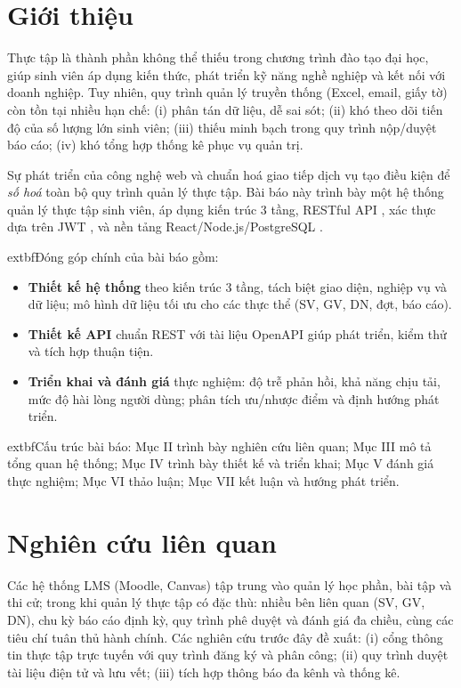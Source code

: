 \documentclass[conference]{IEEEtran}
\begin{document}
\section{Giới thiệu}
Thực tập là thành phần không thể thiếu trong chương trình đào tạo đại học, giúp sinh viên áp dụng kiến thức, phát triển kỹ năng nghề nghiệp và kết nối với doanh nghiệp. Tuy nhiên, quy trình quản lý truyền thống (Excel, email, giấy tờ) còn tồn tại nhiều hạn chế: (i) phân tán dữ liệu, dễ sai sót; (ii) khó theo dõi tiến độ của số lượng lớn sinh viên; (iii) thiếu minh bạch trong quy trình nộp/duyệt báo cáo; (iv) khó tổng hợp thống kê phục vụ quản trị.

Sự phát triển của công nghệ web và chuẩn hoá giao tiếp dịch vụ tạo điều kiện để \textit{số hoá} toàn bộ quy trình quản lý thực tập. Bài báo này trình bày một hệ thống quản lý thực tập sinh viên, áp dụng kiến trúc 3 tầng, RESTful API \cite{openapi}, xác thực dựa trên JWT \cite{jwt}, và nền tảng React/Node.js/PostgreSQL \cite{react,node,postgres}.

	extbf{Đóng góp chính} của bài báo gồm:
\begin{itemize}
  \item \textbf{Thiết kế hệ thống} theo kiến trúc 3 tầng, tách biệt giao diện, nghiệp vụ và dữ liệu; mô hình dữ liệu tối ưu cho các thực thể (SV, GV, DN, đợt, báo cáo).
  \item \textbf{Thiết kế API} chuẩn REST với tài liệu OpenAPI giúp phát triển, kiểm thử và tích hợp thuận tiện.
  \item \textbf{Triển khai và đánh giá} thực nghiệm: độ trễ phản hồi, khả năng chịu tải, mức độ hài lòng người dùng; phân tích ưu/nhược điểm và định hướng phát triển.
\end{itemize}

	extbf{Cấu trúc bài báo}: Mục II trình bày nghiên cứu liên quan; Mục III mô tả tổng quan hệ thống; Mục IV trình bày thiết kế và triển khai; Mục V đánh giá thực nghiệm; Mục VI thảo luận; Mục VII kết luận và hướng phát triển.


\section{Nghiên cứu liên quan}
Các hệ thống LMS (Moodle, Canvas) tập trung vào quản lý học phần, bài tập và thi cử; trong khi quản lý thực tập có đặc thù: nhiều bên liên quan (SV, GV, DN), chu kỳ báo cáo định kỳ, quy trình phê duyệt và đánh giá đa chiều, cùng các tiêu chí tuân thủ hành chính. Các nghiên cứu trước đây đề xuất: (i) cổng thông tin thực tập trực tuyến với quy trình đăng ký và phân công; (ii) quy trình duyệt tài liệu điện tử và lưu vết; (iii) tích hợp thông báo đa kênh và thống kê.
\end{document}
